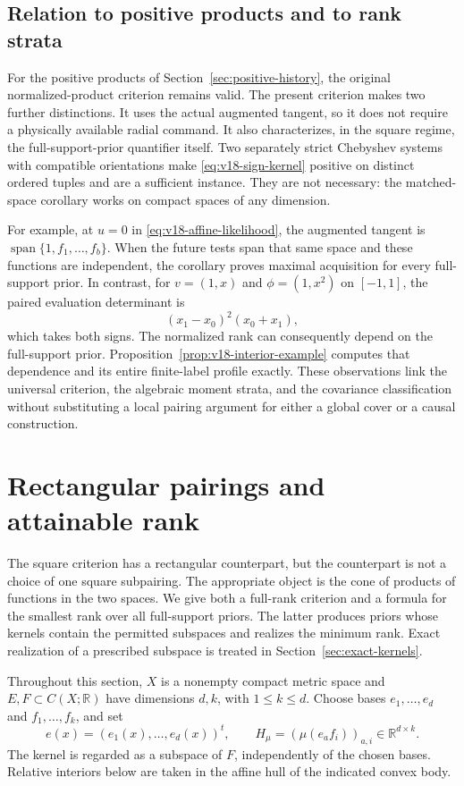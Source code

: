 \documentclass[11pt]{amsart}
\theoremstyle{definition}\newtheorem{definition}[theorem]{Definition}
\theoremstyle{remark}\newtheorem{remark}[theorem]{Remark}
\newcommand{\R}{\mathbb R}\newcommand{\N}{\mathbb N}\newcommand{\C}{\mathbb C}
\begin{document}
\subsection{Relation to positive products and to rank strata}
For the positive products of Section~\ref{sec:positive-history}, the
original normalized-product criterion remains valid. The present
criterion makes two further distinctions. It uses the actual augmented
tangent, so it does not require a physically available radial command.
It also characterizes, in the square regime, the full-support-prior
quantifier itself. Two separately strict Chebyshev systems with compatible
orientations make \eqref{eq:v18-sign-kernel} positive on distinct ordered
tuples and are a sufficient instance. They are not necessary: the
matched-space corollary works on compact spaces of any dimension.

For example, at $u=0$ in \eqref{eq:v18-affine-likelihood}, the augmented
tangent is $\operatorname{span}\{1,f_1,\ldots,f_b\}$. When the future
tests span that same space and these functions are independent, the
corollary proves maximal acquisition for every full-support prior.
In contrast, for $v=(1,x)$ and $\phi=(1,x^2)$ on $[-1,1]$, the paired
evaluation determinant is
\[
 (x_1-x_0)^2(x_0+x_1),
\]
which takes both signs. The normalized rank can consequently depend on
the full-support prior. Proposition~\ref{prop:v18-interior-example}
computes that dependence and its entire finite-label profile exactly.
These observations link the universal criterion, the algebraic moment
strata, and the covariance classification without substituting a local
pairing argument for either a global cover or a causal construction.

\section{Rectangular pairings and attainable rank}
\label{sec:v19-rectangular}
The square criterion has a rectangular counterpart, but the counterpart
is not a choice of one square subpairing. The appropriate object is
the cone of products of functions in the two spaces. We give both a
full-rank criterion and a formula for the smallest rank over all
full-support priors. The latter produces priors whose kernels contain the permitted
subspaces and realizes the minimum rank. Exact realization of a prescribed
subspace is treated in Section~\ref{sec:exact-kernels}.

Throughout this section, $X$ is a nonempty compact metric space and
$E,F\subset C(X;\R)$ have dimensions $d,k$, with $1\le k\le d$.
Choose bases $e_1,\ldots,e_d$ and $f_1,\ldots,f_k$, and set
\[
 e(x)=(e_1(x),\ldots,e_d(x))^t,\qquad
 H_\mu=(\mu(e_a f_i))_{a,i}\in\R^{d\times k}.
\]
The kernel is regarded as a subspace of $F$, independently of the chosen
bases. Relative interiors below are taken in the affine hull of the
indicated convex body.
\end{document}
